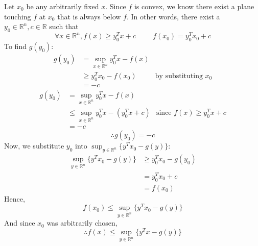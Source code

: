 \documentclass{article}
\newcommand{\R}{\mathbb{R}}
\begin{document}
\begin{enumerate}[label=(\roman*)]
    Let $x_0$ be any arbitrarily fixed $x$. Since $f$ is convex, we know there exist a plane touching $f$ at $x_0$ that is always below $f$. In other words, there exist a $y_0 \in \R^n, c \in \R$ such that
    \[\forall x \in \R^n, f(x) \geq y_0^T x + c \hspace{1cm} f(x_0) = y_0^T x_0 + c\]
    To find $g(y_0)$:
    \begin{align*}
    g(y_0) &= \sup_{x \in \R^n} y_0^T x - f(x) \\
        &\geq y_0^T x_0 - f(x_0) & \text{by substituting $x_0$}\\
        &= -c
    \end{align*}
    \begin{align*}
    g(y_0) &= \sup_{x \in \R^n} y_0^T x - f(x) \\
        &\leq \sup_{x \in \R^n} y_0^T x - (y_0^T x + c) & \text{since }f(x) \geq y_0^T x + c\\
        &= -c
    \end{align*}
    \[\therefore g(y_0) = -c\]
    Now, we substitute $y_0$ into $\sup_{y\in \R^n}\{ y^T x_0 - g(y)\}$:
    \begin{align*}
    \sup_{y\in \R^n}\{ y^T x_0 - g(y)\} &\geq y_0^Tx_0 - g(y_0) \\
        &= y_0^T x_0 + c \\
        &= f(x_0)
    \end{align*}
    Hence,
    \[f(x_0) \leq \sup_{y\in \R^n}\{ y^T x_0 - g(y)\}\]
    And since $x_0$ was arbitrarily chosen,
    \[\therefore f(x) \leq \sup_{y\in \R^n}\{ y^T x - g(y)\} \]
\end{enumerate}
\end{document}
